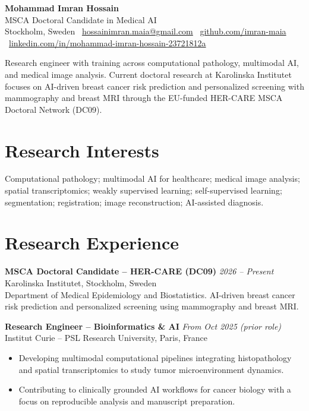 \documentclass[10pt,a4paper]{article}
\begin{document}
{\LARGE\bfseries Mohammad Imran Hossain}\\[0.15em]
{\color{Accent}\large MSCA Doctoral Candidate in Medical AI}\\[0.35em]
Stockholm, Sweden \textbar\ \href{mailto:hossainimran.maia@gmail.com}{hossainimran.maia@gmail.com} \textbar\
\href{https://github.com/imran-maia}{github.com/imran-maia} \textbar\
\href{https://www.linkedin.com/in/mohammad-imran-hossain-23721812a/}{linkedin.com/in/mohammad-imran-hossain-23721812a}

\vspace{0.5em}
Research engineer with training across computational pathology, multimodal AI, and medical image analysis. Current doctoral research at Karolinska Institutet focuses on AI-driven breast cancer risk prediction and personalized screening with mammography and breast MRI through the EU-funded HER-CARE MSCA Doctoral Network (DC09).

\section*{Research Interests}
Computational pathology; multimodal AI for healthcare; medical image analysis; spatial transcriptomics; weakly supervised learning; self-supervised learning; segmentation; registration; image reconstruction; AI-assisted diagnosis.

\section*{Research Experience}
\textbf{MSCA Doctoral Candidate -- HER-CARE (DC09)} \hfill \textit{2026 -- Present}\\
Karolinska Institutet, Stockholm, Sweden\\
Department of Medical Epidemiology and Biostatistics. AI-driven breast cancer risk prediction and personalized screening using mammography and breast MRI.

\textbf{Research Engineer -- Bioinformatics \& AI} \hfill \textit{From Oct 2025 (prior role)}\\
Institut Curie -- PSL Research University, Paris, France
\begin{itemize}
  \item Developing multimodal computational pipelines integrating histopathology and spatial transcriptomics to study tumor microenvironment dynamics.
  \item Contributing to clinically grounded AI workflows for cancer biology with a focus on reproducible analysis and manuscript preparation.
\end{itemize}
\end{document}
